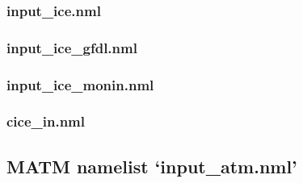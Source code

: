 \documentclass[11pt]{article}
\begin{document}
\subsubsection{input\_ice.nml}
{\tiny }
\subsubsection{input\_ice\_gfdl.nml}
{\tiny }
\subsubsection{input\_ice\_monin.nml}
{\tiny }
\subsubsection{cice\_in.nml}
{\tiny }

\subsection{MATM namelist `input\_atm.nml'}
\renewcommand{\link}[2]{\href{https://github.com/OceansAus/matm/search?q=#2}{#1}} %
{\tiny }



\end{document}
